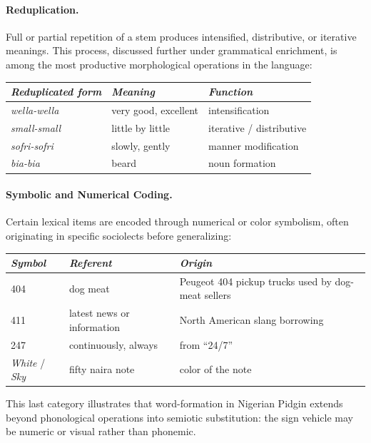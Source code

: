 \documentclass[12pt]{article}
\begin{document}
\paragraph{Reduplication.}
Full or partial repetition of a stem produces intensified, distributive, or iterative meanings. This process, discussed further under grammatical enrichment, is among the most productive morphological operations in the language:

\begin{center}
\begin{tabular}{lll}
\textit{Reduplicated form} & \textit{Meaning} & \textit{Function} \\
\hline
\textit{wella-wella} & very good, excellent & intensification \\
\textit{small-small} & little by little & iterative / distributive \\
\textit{sofri-sofri} & slowly, gently & manner modification \\
\textit{bia-bia} & beard & noun formation \\
\end{tabular}
\end{center}

\paragraph{Symbolic and Numerical Coding.}
Certain lexical items are encoded through numerical or color symbolism, often originating in specific sociolects before generalizing:

\begin{center}
\begin{tabular}{lll}
\textit{Symbol} & \textit{Referent} & \textit{Origin} \\
\hline
404 & dog meat & Peugeot 404 pickup trucks used by dog-meat sellers \\
411 & latest news or information & North American slang borrowing \\
247 & continuously, always & from ``24/7'' \\
\textit{White} / \textit{Sky} & fifty naira note & color of the note \\
\end{tabular}
\end{center}

This last category illustrates that word-formation in Nigerian Pidgin extends beyond phonological operations into semiotic substitution: the sign vehicle may be numeric or visual rather than phonemic.
\end{document}
